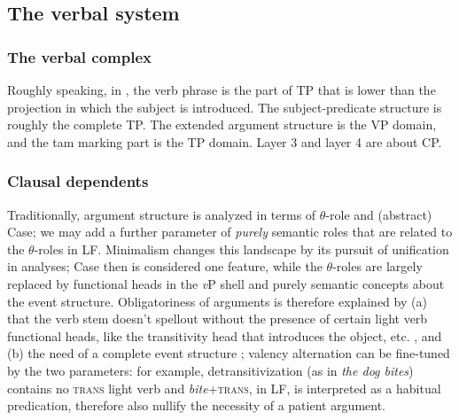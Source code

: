 \documentclass[UTF8, a4paper, oneside, scheme=plain, 12pt]{ctexbook}
\newcommand{\form}[1]{\emph{#1}}
\newcommand{\category}[1]{\textsc{#1}}
\newcommand{\vP}{\textit{v}P}
\begin{document}
{\subsection{The verbal system}

\subsubsection{The verbal complex}\label{sec:vp-tp-cp}

Roughly speaking, in ,
the verb phrase is the part of TP that is lower than the projection in which the subject is introduced.
The subject-predicate structure is roughly the complete TP.
The extended argument structure is the VP domain, 
and the \acs{tam} marking part is the TP domain.
Layer 3 and layer 4 are about CP.


\subsubsection{Clausal dependents}\label{sec:theory.clause-dependent}


Traditionally, argument structure is analyzed in terms of $\theta$-role and (abstract) Case; 
we may add a further parameter of \emph{purely} semantic roles 
that are related to the $\theta$-roles in LF.
Minimalism changes this landscape by its pursuit of unification in analyses; 
Case then is considered one feature, 
while the $\theta$-roles are largely replaced by functional heads in the \vP{} shell \citep{harley2011theta}
and purely semantic concepts about the event structure.
Obligatoriness of arguments is therefore explained by 
(a) that the verb stem doesn't spellout without the presence of certain light verb functional heads, 
like the transitivity head that introduces the object, etc. \citep{siddiqi2009syntax}, and 
(b) the need of a complete event structure \citep{grimshaw1993obligatory}; 
valency alternation can be fine-tuned by the two parameters: 
for example, detransitivization (as in \form{the dog bites}) 
contains no \category{trans} light verb 
and \form{bite}+\category{trans}, in LF, is interpreted as a habitual predication, 
therefore also nullify the necessity of a patient argument.

}
\end{document}
